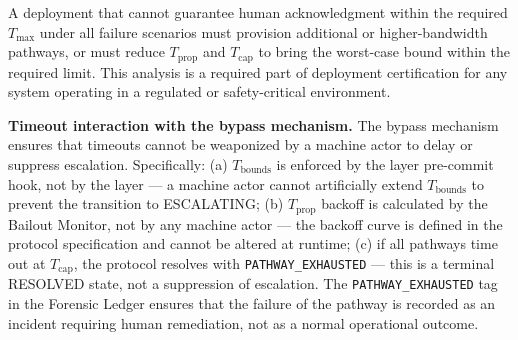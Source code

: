 A deployment that cannot guarantee human acknowledgment within the required $T_{\max}$ under all failure scenarios must provision additional or higher-bandwidth pathways, or must reduce $T_{\text{prop}}$ and $T_{\text{cap}}$ to bring the worst-case bound within the required limit. This analysis is a required part of deployment certification for any \bxthree{} system operating in a regulated or safety-critical environment.

\medskip\noindent\textbf{Timeout interaction with the bypass mechanism.} The bypass mechanism ensures that timeouts cannot be weaponized by a machine actor to delay or suppress escalation. Specifically: (a) $T_{\text{bounds}}$ is enforced by the \fact{} layer pre-commit hook, not by the \bounds{} layer — a machine actor cannot artificially extend $T_{\text{bounds}}$ to prevent the transition to ESCALATING; (b) $T_{\text{prop}}$ backoff is calculated by the Bailout Monitor, not by any machine actor — the backoff curve is defined in the protocol specification and cannot be altered at runtime; (c) if all pathways time out at $T_{\text{cap}}$, the protocol resolves with \texttt{PATHWAY\_EXHAUSTED} — this is a terminal RESOLVED state, not a suppression of escalation. The \texttt{PATHWAY\_EXHAUSTED} tag in the Forensic Ledger ensures that the failure of the pathway is recorded as an incident requiring human remediation, not as a normal operational outcome.
